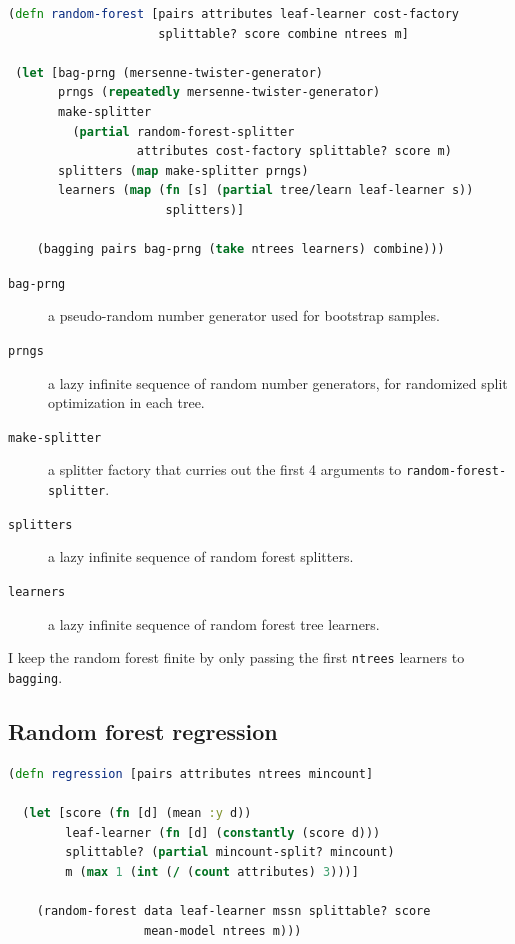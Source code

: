 \documentclass[10pt,openany]{article}
\numberwithin{definition}{section}
\numberwithin{example}{section}
\numberwithin{equation}{section}
\numberwithin{figure}{section}
\begin{document}
\begin{minipage}[t]{1\columnwidth}%
\begin{lstlisting}[caption={Generic random forests},label={lis:random-forests},language=clojure,tabsize=2]
(defn random-forest [pairs attributes leaf-learner cost-factory
                     splittable? score combine ntrees m]

 (let [bag-prng (mersenne-twister-generator)
       prngs (repeatedly mersenne-twister-generator)
       make-splitter
         (partial random-forest-splitter 
                  attributes cost-factory splittable? score m)
       splitters (map make-splitter prngs)
       learners (map (fn [s] (partial tree/learn leaf-learner s)) 
                      splitters)]

    (bagging pairs bag-prng (take ntrees learners) combine)))  
\end{lstlisting}
%
\end{minipage}
\begin{description}
\item [{\texttt{bag-prng}}] a pseudo-random number generator used for bootstrap
samples.
\item [{\texttt{prngs}}] a lazy infinite sequence of random number generators,
for randomized split optimization in each tree.
\item [{\texttt{make-splitter}}] a splitter factory that curries out the
first 4 arguments to \texttt{random-forest-splitter}.
\item [{\texttt{splitters}}] a lazy infinite sequence of random forest
splitters.
\item [{\texttt{learners}}] a lazy infinite sequence of random forest tree
learners.
\end{description}
I keep the random forest finite by only passing the first \texttt{ntrees}
learners to \texttt{bagging}.

\subsection{\label{sub:Random-forest-regression}Random forest regression}

\begin{minipage}[t]{1\columnwidth}%
\begin{lstlisting}[caption={Random forest regression},label={lis:random-forest-regression},language=clojure,tabsize=2]
(defn regression [pairs attributes ntrees mincount]

  (let [score (fn [d] (mean :y d))
        leaf-learner (fn [d] (constantly (score d)))
        splittable? (partial mincount-split? mincount)
        m (max 1 (int (/ (count attributes) 3)))]

    (random-forest data leaf-learner mssn splittable? score
                   mean-model ntrees m)))
\end{lstlisting}
%
\end{minipage}
\end{document}
